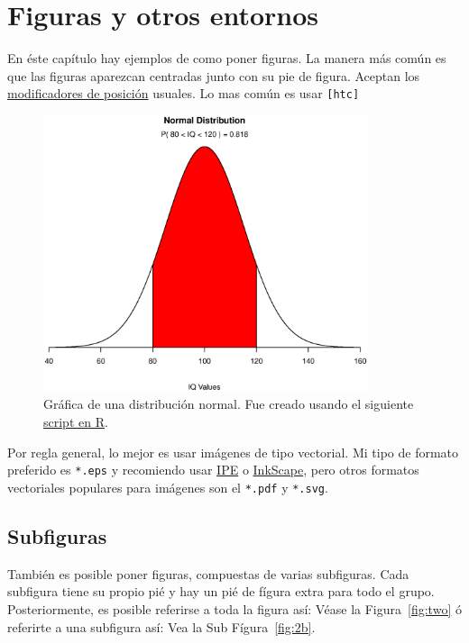 \chapter{Figuras y otros entornos}
\label{chap:figuras}
En éste capítulo hay ejemplos de como poner figuras.
La manera más común es que las figuras aparezcan centradas junto con su pie de figura.
Aceptan los \href{https://en.wikibooks.org/wiki/LaTeX/Floats,_Figures_and_Captions#Figures}{modificadores de posición} usuales.
Lo mas común es usar \texttt{[htc]}
 
\begin{figure}[htb]
  \centering
  \label{fig:normalDist}
  \includegraphics[width=0.85\textwidth]{img/cap02/normal}
  \caption[Distribución normal]{Gráfica de una distribución normal. Fue creado usando el siguiente \href{https://www.statmethods.net/advgraphs/probability.html}{script en R}.}
\end{figure}

Por regla general, lo mejor es usar imágenes de tipo vectorial.
Mi tipo de formato preferido es \verb|*.eps| y recomiendo usar \href{https://ipe.otfried.org/}{IPE} o \href{https://inkscape.org/}{InkScape}, pero otros formatos vectoriales populares para imágenes son el \verb|*.pdf| y \verb|*.svg|.

\section{Subfiguras}

También es posible poner figuras, compuestas de varias subfiguras.
Cada subfigura tiene su propio pié y hay un pié de fígura extra para todo el grupo.
Posteriormente, es posible referirse a toda la figura así: Véase la  Figura~\ref{fig:two} ó referirte a una subfigura así:
Vea la Sub Fígura~\ref{fig:2b}.


